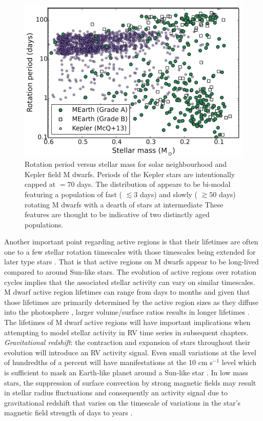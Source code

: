 \begin{figure}
  \centering
  \includegraphics[width=.8\textwidth]{figures/mdwarfrotation.png}
  \caption[Empirical distribution of M dwarf photometric rotation periods.]
      {Rotation period versus stellar mass for solar neighbourhood and Kepler field
    M dwarfs. Periods of the Kepler stars are intentionally capped at \prot{} $=70$ days.
    The distribution of \prot{} appears to be bi-modal featuring a
    population of fast (\prot{} $\lesssim 3$ days) and slowly (\prot{} $\gtrsim 50$ days)
    rotating M dwarfs with a dearth of stars at intermediate  These features are
    thought to be indicative of two distinctly aged populations. 
    \citep[Image credit:][]{newton16a}}
\label{fig:rotation}
\end{figure}

Another important point regarding active regions is that their lifetimes are often
one to a few stellar rotation timescales with those timescales being extended for later
type stars \citep{giles17}. That is that active regions on M dwarfs appear to be long-lived
compared to around Sun-like stars.
The evolution of active regions over rotation cycles implies that the associated
stellar activity can vary on similar timescales. %
M dwarf active region lifetimes can range from days to months and given that those
lifetimes are primarily determined by the active region sizes as they
diffuse into the photosphere \citep{berdyugina05}, larger volume/surface ratios results in
longer lifetimes \citep{petrovay97,giles17}. The lifetimes of M dwarf active regions will
have important implications when attempting to model stellar activity in RV time series in
subsequent chapters. \\

\emph{Gravitational redshift}:
the contraction and expansion of stars throughout their evolution will introduce an RV activity
signal. Even small variations at the level of hundredths of a percent will have manifestations
at the 10 cm s$^{-1}$ level which is sufficient to mask an Earth-like planet around a Sun-like star
\citep{lindegren03}. In low mass stars, the suppression of surface convection by strong magnetic fields
may result in stellar radius fluctuations and consequently an activity signal due to gravitational
redshift that varies on the timescale of variations in the star's magnetic field strength of days to
years \citep{cegla12}. \\


